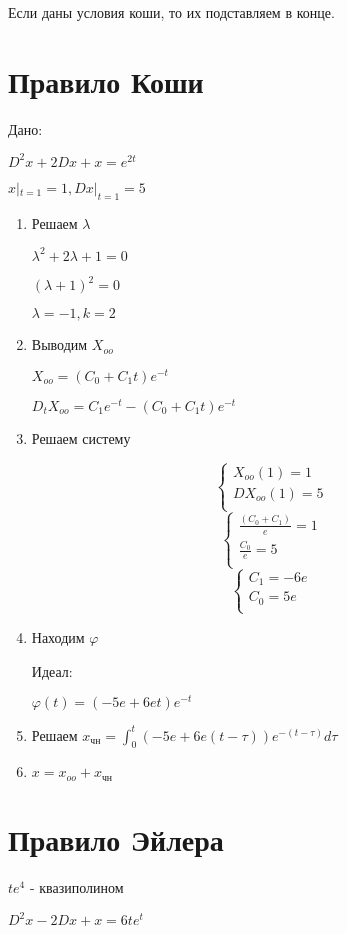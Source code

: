\documentclass[a4paper, 12pt]{article}
\begin{document}
Если даны условия коши, то их подставляем в конце.
\section{Правило Коши}
Дано:

$D^2x+2Dx+x = e^{2t}$

$x|_{t=1}=1, Dx|_{t=1}=5$
\begin{enumerate}
    \item Решаем $\lambda$
    
    $\lambda^2+2\lambda+1=0$

    $(\lambda+1)^2=0$

    $\lambda=-1,k=2$
    \item Выводим $X_{oo}$
    
    $X_{oo}=(C_0+C_{1}t)e^{-t}$

    $D_tX_{oo}=C_1e^{-t}-(C_0+C_{1}t)e^{-t}$
    \item Решаем систему
    
\[
\left\{
\begin{aligned}
    X_{oo}(1)=1 \\
    DX_{oo}(1)=5 \\
\end{aligned}
\right.
\]  
\[
\left\{
\begin{aligned}
    \frac{(C_0+C_{1})}{e}=1 \\
    \frac{C_0}{e}=5 \\
\end{aligned}
\right.
\]  
\[
\left\{
\begin{aligned}
    C_1=-6e \\
    C_0=5e \\
\end{aligned}
\right.
\] 
    \item Находим $\varphi$
    
    Идеал: 

    $\varphi(t)=(-5e+6et)e^{-t}$

    \item Решаем $x_{\text{чн}}=\int_{0}^{t}(-5e+6e(t-\tau))e^{-(t-\tau)}d\tau$
    \item $x=x_{oo}+x_{\text{чн}}$
\end{enumerate}
\section{Правило Эйлера}
$te^4$ - квазиполином

$D^2x-2Dx+x=6te^t$
\end{document}

